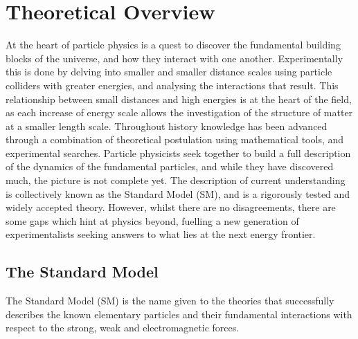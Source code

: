 \chapter{Theoretical Overview}
\label{ch:theory}
At the heart of particle physics is a quest to discover the fundamental building blocks of the universe, and how they interact with one another. Experimentally this is done by delving into smaller and smaller distance scales using particle colliders with greater energies, and analysing the interactions that result. This relationship between small distances and high energies is at the heart of the field, as each increase of energy scale allows the investigation of the structure of matter at a smaller length scale. Throughout history knowledge has been advanced through a combination of theoretical postulation using mathematical tools, and experimental searches. Particle physicists seek together to build a full description of the dynamics of the fundamental particles, and while they have discovered much, the picture is not complete yet. The description of current understanding is collectively known as the Standard Model (SM), and is a rigorously tested and widely accepted theory. However, whilst there are no disagreements, there are some gaps which hint at physics beyond, fuelling a new generation of experimentalists seeking answers to what lies at the next energy frontier.

\section{The Standard Model}

The Standard Model (SM) is the name given to the theories that successfully describes the known elementary particles and their fundamental interactions with respect to the strong, weak and electromagnetic forces. 


